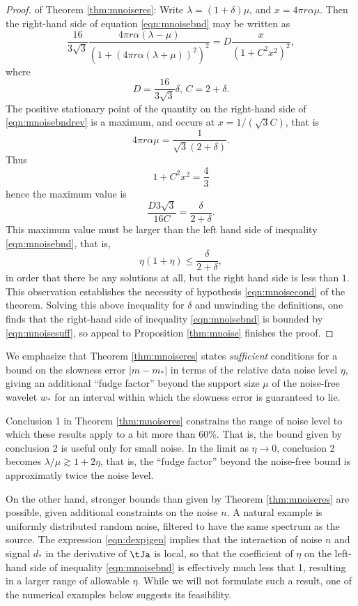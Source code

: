 \begin{proof} of Theorem \ref{thm:mnoiseres}:
  Write $\lambda = (1+\delta)\mu$, and $x=4 \pi r \alpha \mu$. Then
  the right-hand side of equation \ref{eqn:mnoisebnd} may be written as
  \begin{equation}
    \label{eqn:mnoisebndrev}
    \frac{16}{3\sqrt{3}}\frac{4\pi r \alpha
      (\lambda-\mu)}{(1+(4\pi r\alpha(\lambda+\mu))^2)^2} = D
    \frac{x}{(1+C^2 x^2)^2},
  \end{equation}
  where
  \[
    D=\frac{16}{3\sqrt{3}}\delta,\,C=2+\delta.
  \]
  The positive stationary point of the quantity on the right-hand side
  of \ref{eqn:mnoisebndrev} is a maximum, and occurs at
  $x=1/(\sqrt{3}C)$, that is
  \[
    4 \pi r \alpha \mu = \frac{1}{\sqrt{3}(2+\delta)}.
  \]
  Thus
  \[
    1+C^2x^2 = \frac{4}{3}
  \]
  hence the maximum value is
  \[
    \frac{D3\sqrt{3}}{16C} = \frac{\delta}{2+\delta}.
  \]
  This maximum value must be larger than the left hand side of inequality
  \ref{eqn:mnoisebnd}, that is,
  \[
    \eta(1+\eta) \le \frac{\delta}{2+\delta},
  \]
  in order that there be any solutions at all, but the right hand side
  is less than $1$. This observation establishes the necessity of
  hypothesis \ref{eqn:mnoisecond} of the
  theorem. Solving this above inequality for $\delta$ and unwinding
  the definitions, one finds that the right-hand side of inequality
  \ref{eqn:mnoisebnd} is bounded by \ref{eqn:mnoisesuff}, so appeal to
  Proposition \ref{thm:mnoise} finishes the proof.
\end{proof}

 We emphasize that Theorem \ref{thm:mnoiseres} states {\em sufficient} conditions for a bound on
the slowness error $|m-m_*|$ in terms of the relative data noise level $\eta$,
giving an additional ``fudge factor'' beyond the support size $\mu$
of the noise-free wavelet $w_*$ for an interval within which the slowness error is
guaranteed to lie.

Conclusion 1 in Theorem \ref{thm:mnoiseres} constrains the range of
noise level to which these results apply to a bit more than 60\%. That
is, the bound given by conclusion 2 is useful only for small noise. In
the limit as $\eta \rightarrow 0$, conclusion 2 becomes
$\lambda/\mu \gtrsim 1 + 2\eta$, that is, the ``fudge factor'' beyond
the noise-free bound is approximatly twice the noise level.

On the other hand, stronger bounds than given by Theorem
\ref{thm:mnoiseres} are possible, given additional constraints on the
noise $n$. A natural example is uniformly distributed random noise,
filtered to have the same spectrum as the source. The expression
\ref{eqn:dexpjgen} implies that the interaction of noise $n$ and
signal $d_*$ in the derivative of $\tJa$ is local, so that the
coefficient of $\eta$ on the left-hand side of inequality
\ref{eqn:mnoisebnd} is effectively much less that 1, resulting in a
larger range of allowable $\eta$. While we will not formulate such a
result, one of the numerical examples below suggests its feasibility.
  
